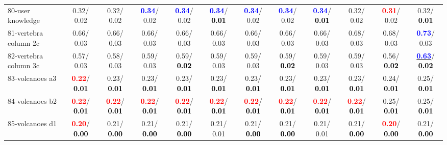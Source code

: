 \begin{table}[h]
\begin{center}
{\begin{tabular}{lc|c|c|c|c|c|c|c|c|c|c}
80-user knowledge &   0.32/  0.02 &   0.32/  0.02 & \textcolor{blue}{\textbf{  0.34}}/  0.02 & \textcolor{blue}{\textbf{  0.34}}/  0.02 & \textcolor{blue}{\textbf{  0.34}}/\textcolor{black}{\textbf{  0.01}} & \textcolor{blue}{\textbf{  0.34}}/  0.02 & \textcolor{blue}{\textbf{  0.34}}/  0.02 & \textcolor{blue}{\textbf{  0.34}}/\textcolor{black}{\textbf{  0.01}} &   0.32/  0.02 & \textcolor{red}{\textbf{  0.31}}/  0.02 &   0.32/\textcolor{black}{\textbf{  0.01}} \\
81-vertebra column 2c &   0.66/  0.03 &   0.66/  0.03 &   0.66/  0.03 &   0.66/  0.03 &   0.66/  0.03 &   0.66/  0.03 &   0.66/  0.03 &   0.66/  0.03 &   0.68/  0.03 &   0.68/  0.03 & \textcolor{blue}{\textbf{  0.73}}/  0.03 \\
82-vertebra column 3c &   0.57/  0.03 &   0.58/  0.03 &   0.59/  0.03 &   0.59/\textcolor{black}{\textbf{  0.02}} &   0.59/  0.03 &   0.59/  0.03 &   0.59/\textcolor{black}{\textbf{  0.02}} &   0.59/  0.03 &   0.59/  0.03 &   0.56/\textcolor{black}{\textbf{  0.02}} & \underline{\textcolor{blue}{\textbf{  0.63}}}/\textcolor{black}{\textbf{  0.02}} \\
83-volcanoes a3 & \textcolor{red}{\textbf{  0.22}}/\textcolor{black}{\textbf{  0.01}} &   0.23/\textcolor{black}{\textbf{  0.01}} &   0.23/\textcolor{black}{\textbf{  0.01}} &   0.23/\textcolor{black}{\textbf{  0.01}} &   0.23/\textcolor{black}{\textbf{  0.01}} &   0.23/\textcolor{black}{\textbf{  0.01}} &   0.23/\textcolor{black}{\textbf{  0.01}} &   0.23/\textcolor{black}{\textbf{  0.01}} &   0.23/\textcolor{black}{\textbf{  0.01}} &   0.24/\textcolor{black}{\textbf{  0.01}} &   0.25/\textcolor{black}{\textbf{  0.01}} \\
84-volcanoes b2 & \textcolor{red}{\textbf{  0.22}}/\textcolor{black}{\textbf{  0.01}} & \textcolor{red}{\textbf{  0.22}}/\textcolor{black}{\textbf{  0.01}} & \textcolor{red}{\textbf{  0.22}}/\textcolor{black}{\textbf{  0.01}} & \textcolor{red}{\textbf{  0.22}}/\textcolor{black}{\textbf{  0.01}} & \textcolor{red}{\textbf{  0.22}}/\textcolor{black}{\textbf{  0.01}} & \textcolor{red}{\textbf{  0.22}}/\textcolor{black}{\textbf{  0.01}} & \textcolor{red}{\textbf{  0.22}}/\textcolor{black}{\textbf{  0.01}} & \textcolor{red}{\textbf{  0.22}}/\textcolor{black}{\textbf{  0.01}} & \textcolor{red}{\textbf{  0.22}}/\textcolor{black}{\textbf{  0.01}} &   0.25/\textcolor{black}{\textbf{  0.01}} &   0.25/\textcolor{black}{\textbf{  0.01}} \\
85-volcanoes d1 & \textcolor{red}{\textbf{  0.20}}/\textcolor{black}{\textbf{  0.00}} &   0.21/\textcolor{black}{\textbf{  0.00}} &   0.21/\textcolor{black}{\textbf{  0.00}} &   0.21/\textcolor{black}{\textbf{  0.00}} &   0.21/  0.01 &   0.21/\textcolor{black}{\textbf{  0.00}} &   0.21/\textcolor{black}{\textbf{  0.00}} &   0.21/  0.01 &   0.21/\textcolor{black}{\textbf{  0.00}} & \textcolor{red}{\textbf{  0.20}}/\textcolor{black}{\textbf{  0.00}} &   0.21/\textcolor{black}{\textbf{  0.00}} \\ \hline

\end{tabular}}
\end{center}
\end{table}
